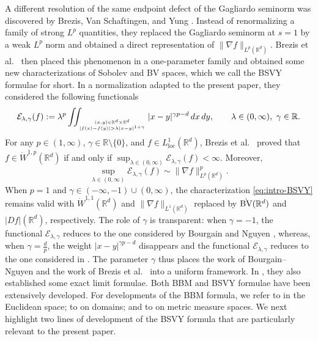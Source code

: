\documentclass[11pt]{amsart}
\theoremstyle{definition}
\theoremstyle{remark}
\numberwithin{equation}{section}
\def\gfz{\genfrac{}{}{0pt}{}}
\begin{document}
A different resolution of the same endpoint defect of
the Gagliardo seminorm was discovered by Brezis,
Van Schaftingen, and Yung \cite{BVY21}.  Instead of renormalizing a family of
strong $L^p$ quantities, they replaced the Gagliardo seminorm at
$s=1$ by a weak $L^p$ norm and obtained a direct representation of
$\|\nabla f\|_{L^p(\mathbb R^d)}$.  Brezis et al.\ \cite{BSVY} then placed this phenomenon
in a one-parameter family and
obtained some new characterizations of Sobolev and BV spaces, which we call
the BSVY formulae for short.
In a normalization
adapted to the present paper, they considered the following functionals
\begin{equation*}
 \mathcal E_{\lambda,\gamma}(f)
 :=\lambda^p
 \iint_{\gfz{(x,y)\in\mathbb R^d\times\mathbb R^d}
 {|f(x)-f(y)|>\lambda|x-y|^{1+\gamma}}}
 |x-y|^{\gamma p-d}\,dx\,dy,
 \qquad \lambda\in(0,\infty),\ \gamma\in\mathbb R.
\end{equation*}
For any $p\in(1,\infty)$, $\gamma\in\mathbb R\setminus\{0\}$, and
$f\in L^1_{\mathrm{loc}}(\mathbb R^d)$, Brezis et al.\ \cite{BSVY} proved that
$f\in\dot W^{1,p}(\mathbb R^d)$
if and only if
$\sup_{\lambda\in(0,\infty)}\mathcal E_{\lambda,\gamma}(f)<\infty$.
Moreover,
\begin{equation}\label{eq:intro-BSVY}
 \sup_{\lambda\in(0,\infty)}\mathcal E_{\lambda,\gamma}(f)
 \sim\|\nabla f\|_{L^p(\mathbb R^d)}^p.
\end{equation}
When $p=1$ and $\gamma\in(-\infty,-1)\cup(0,\infty)$, the characterization
\eqref{eq:intro-BSVY} remains valid with
$\dot W^{1,1}(\mathbb R^d)$ and $\|\nabla f\|_{L^1(\mathbb R^d)}$ replaced by
$\dot{\rm BV}(\mathbb R^d)$ and $|Df|(\mathbb R^d)$, respectively.  The role
of $\gamma$ is transparent: when $\gamma=-1$, the functional $\mathcal E_{\lambda,\gamma}$
reduces to the
one considered by Bourgain and Nguyen \cite{BN06}, whereas, when $\gamma=\frac dp$, the
weight $|x-y|^{\gamma p-d}$ disappears and the functional $\mathcal E_{\lambda,\gamma}$
reduces to the one
considered in \cite{BVY21}.  The parameter $\gamma$ thus places the work of
Bourgain--Nguyen \cite{BN06} and the work of Brezis et al.\ \cite{BVY21}
into a uniform framework. In \cite{BSVY}, they also established
some exact limit formulae.  Both BBM and BSVY formulae have been extensively
developed.  For developments of the BBM formula, we
refer to \cite{BBM02,Davila02,DominguezMilman23,Ponce04} in the  Euclidean space;
to \cite{DrelichmanDuran22,Mohanta24} on domains; and to \cite{DMS,Han24}
on metric measure spaces.  We next highlight two lines of development
of the BSVY formula that are particularly relevant to the present paper.
\end{document}
